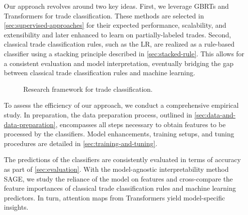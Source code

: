 Our approach revolves around two key ideas. First, we leverage \glspl{GBRT} and Transformers for trade classification. These methods are selected in \cref{sec:supervised-approaches} for their expected performance, scalability, and extensibility and later enhanced to learn on partially-labeled trades. Second, classical trade classification rules, such as the \gls{LR}, are realized as a rule-based classifier using a stacking principle described in \cref{sec:stacked-rule}. This allows for a consistent evaluation and model interpretation, eventually bridging the gap between classical trade classification rules and machine learning.

\begin{figure}[!ht]
    \centering
    {\renewcommand\normalsize{\tiny}
        \normalsize
        }
    \caption[Research Framework]{Research framework for trade classification.}
    \label{fig:research-framework}
\end{figure}

To assess the efficiency of our approach, we conduct a comprehensive empirical study. In preparation, the data preparation process, outlined in \cref{sec:data-and-data-preparation}, encompasses all steps necessary to obtain features to be processed by the classifiers. Model enhancements, training setups, and tuning procedures are detailed in \cref{sec:training-and-tuning}. 

The predictions of the classifiers are consistently evaluated in terms of accuracy as part of \cref{sec:evaluation}. With the model-agnostic interpretability method \gls{SAGE}, we study the reliance of the model on features and cross-compare the feature importances of classical trade classification rules and machine learning predictors. In turn, attention maps from Transformers yield model-specific insights.
